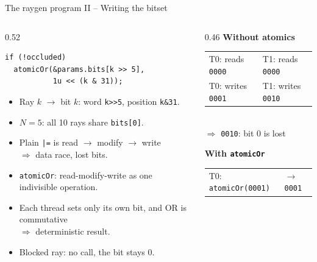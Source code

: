 \documentclass[8pt, xcolor=table,aspectratio=169]{beamer}
\begin{document}
\begin{frame}[fragile]{\textcolor{activecolor}{The raygen program II -- Writing the bitset}}
  \begin{columns}[T]
    \begin{column}{0.52\textwidth}
      \small
      \begin{lstlisting}[basicstyle=\normalsize\ttfamily]
if (!occluded)
  atomicOr(&params.bits[k >> 5],
           1u << (k & 31));
      \end{lstlisting}
      \vspace{1mm}
      \begin{itemize}
        \item Ray $k$ $\to$ bit $k$: word \texttt{k>>5}, position \texttt{k\&31}.
        \item $N=5$: all 10 rays share \texttt{bits[0]}.
        \item Plain \verb+|=+ is read $\to$ modify $\to$ write\\
              $\Rightarrow$ \alert{data race, lost bits}.
        \item \texttt{atomicOr}: read-modify-write as one \alert{indivisible} operation.
        \item Each thread sets \alert{only its own bit}, and OR is commutative\\
              $\Rightarrow$ deterministic result.
        \item Blocked ray: no call, the bit stays 0.
      \end{itemize}
    \end{column}
    \begin{column}{0.46\textwidth}
      \small
      \textbf{Without atomics}
      \begin{center}
      \begin{tabular}{ll}
        T0: reads \texttt{0000} & T1: reads \texttt{0000}\\
        T0: writes \texttt{0001} & T1: writes \texttt{0010}\\
      \end{tabular}\\[1mm]
      \alert{$\Rightarrow$ \texttt{0010}: bit 0 is lost}
      \end{center}
      \vspace{2mm}
      \textbf{With \texttt{atomicOr}}
      \begin{center}
      \begin{tabular}{ll}
        T0: \texttt{atomicOr(0001)} & $\to$ \texttt{0001}\\

\end{tabular}
\end{center}
\end{column}
\end{columns}
\end{frame}
\end{document}
